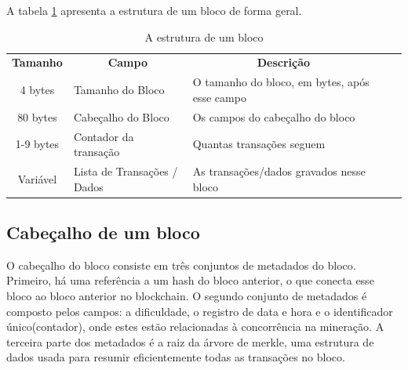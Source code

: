         A tabela \ref{tabela_estrutura_de_um_bloco} apresenta a estrutura de um bloco de forma geral.
        
  
        \begin{table}[H]
            \begin{tabular}{|c|l|l|ll}
            \cline{1-3}
            \cellcolor[HTML]{9AFF99}\textbf{Tamanho} & \multicolumn{1}{c|}{\cellcolor[HTML]{9AFF99}\textbf{Campo}} & \multicolumn{1}{c|}{\cellcolor[HTML]{9AFF99}\textbf{Descrição}} &  &  \\ \cline{1-3}
            4 bytes                                  & Tamanho do Bloco                                            & O tamanho do bloco, em bytes, após esse campo                   &  &  \\ \cline{1-3}
            80 bytes                                 & Cabeçalho do Bloco                                          & Os campos do cabeçalho do bloco                                 &  &  \\ \cline{1-3}
            1-9 bytes                                & Contador da transação                                       & Quantas transações seguem                                       &  &  \\ \cline{1-3}
            Variável                                 & Lista de Transações / Dados                                 & As transações/dados gravados nesse bloco                              &  &  \\ \cline{1-3}
            \end{tabular}
        \caption{A estrutura de um bloco}
        \label{tabela_estrutura_de_um_bloco}
        \end{table}
            
    \subsection{Cabeçalho de um bloco}

    O cabeçalho do bloco consiste em três conjuntos de metadados do bloco. Primeiro, há uma referência a um hash do bloco anterior, o que conecta esse bloco ao bloco anterior no blockchain. O segundo conjunto de metadados é composto pelos campos: a dificuldade, o registro de data e hora e o identificador único(contador), onde estes estão relacionadas à concorrência na mineração. A terceira parte dos metadados é a raiz da árvore de merkle, uma estrutura de dados usada para resumir eficientemente todas as transações no bloco.\cite{mastering_blockchain_andreas}

